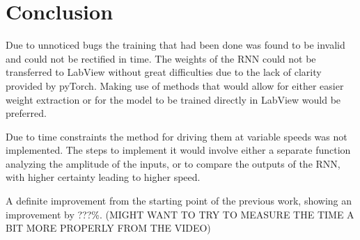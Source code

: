 \section{Conclusion}


Due to unnoticed bugs the training that had been done was found to be invalid and could not be rectified in time.
The
weights of the RNN could not be transferred to LabView without great difficulties due to the lack of clarity provided by
pyTorch. Making use of methods that would allow for either easier weight extraction or for the model to be trained
directly in LabView would be preferred.


Due to time constraints the method for driving them at variable speeds was not implemented. The steps to implement it
would involve either a separate function analyzing the amplitude of the inputs, or to compare the outputs of the RNN,
with higher certainty leading to higher speed.


A definite improvement from the starting point of the previous work, showing an improvement by ???\%. (MIGHT WANT TO TRY TO MEASURE THE TIME A BIT MORE
PROPERLY FROM THE VIDEO)


